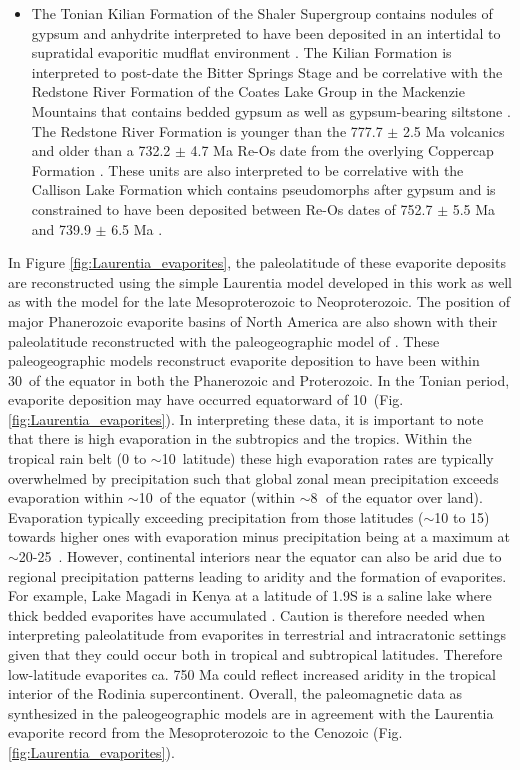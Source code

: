 \documentclass[twocolumn, switch]{article} %
\begin{document}
\begin{itemize}
\item The Tonian Kilian Formation of the Shaler Supergroup contains nodules of gypsum and anhydrite interpreted to have been deposited in an intertidal to supratidal evaporitic mudflat environment \citep{Prince2014a}. The Kilian Formation is interpreted to post-date the Bitter Springs Stage and be correlative with the Redstone River Formation of the Coates Lake Group in the Mackenzie Mountains that contains bedded gypsum as well as gypsum-bearing siltstone \citep{Jefferson1989a, Jones2010a}. The Redstone River Formation is younger than the 777.7 $\pm$ 2.5 Ma volcanics and older than a 732.2 $\pm$ 4.7 Ma Re-Os date from the overlying Coppercap Formation \citep{Rooney2014a}. These units are also interpreted to be correlative with the Callison Lake Formation which contains pseudomorphs after gypsum and is constrained to have been deposited between Re-Os dates of 752.7 $\pm$ 5.5 Ma and 739.9 $\pm$ 6.5 Ma \citep{Strauss2015a}.
\end{itemize}

In Figure \ref{fig:Laurentia_evaporites}, the paleolatitude of these evaporite deposits are reconstructed using the simple Laurentia model developed in this work as well as with the \cite{Li2013a} model for the late Mesoproterozoic to Neoproterozoic. The position of major Phanerozoic evaporite basins of North America are also shown with their paleolatitude reconstructed with the paleogeographic model of \cite{Torsvik2017a}. These paleogeographic models reconstruct evaporite deposition to have been within 30\textdegree\ of the equator in both the Phanerozoic and Proterozoic. In the Tonian period, evaporite deposition may have occurred equatorward of 10\textdegree\ (Fig. \ref{fig:Laurentia_evaporites}). In interpreting these data, it is important to note that there is high evaporation in the subtropics and the tropics. Within the tropical rain belt (0 to $\sim$10\textdegree\ latitude) these high evaporation rates are typically overwhelmed by precipitation such that global zonal mean precipitation exceeds evaporation within $\sim$10\textdegree\ of the equator (within $\sim$8\textdegree$\;$ of the equator over land). Evaporation typically exceeding precipitation from those latitudes ($\sim$10 to 15\textdegree) towards higher ones with evaporation minus precipitation being at a maximum at $\sim$20-25\textdegree\ \citep{Park2021a}. However, continental interiors near the equator can also be arid due to regional precipitation patterns leading to aridity and the formation of evaporites. For example, Lake Magadi in Kenya at a latitude of 1.9\textdegree S is a saline lake where thick bedded evaporites have accumulated \citep{Eugster1980a}. Caution is therefore needed when interpreting paleolatitude from evaporites in terrestrial and intracratonic settings given that they could occur both in tropical and subtropical latitudes. Therefore low-latitude evaporites ca. 750 Ma could reflect increased aridity in the tropical interior of the Rodinia supercontinent. Overall, the paleomagnetic data as synthesized in the paleogeographic models are in agreement with the Laurentia evaporite record from the Mesoproterozoic to the Cenozoic (Fig. \ref{fig:Laurentia_evaporites}).
\end{document}
